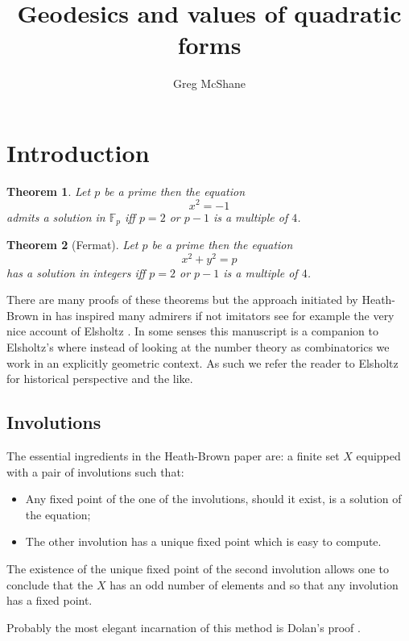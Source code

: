 \documentclass[12pt,a4paper]{amsart}
\title{Geodesics and values of quadratic forms}
\author[McShane]{Greg McShane}
\newtheorem{thm}{Theorem}[section]
\def\fp{\mathbb{F}_p}
\begin{document}
\maketitle

\section{Introduction}

	

\begin{thm}\label{triv}
Let $p$ be a prime then the equation
$$x^2 = -1$$
admits a solution in $\fp$ iff 
$p =2$ or $p-1$ is a multiple of $4$.
\end{thm}


\begin{thm}[Fermat]\label{main}
Let $p$ be a prime then the equation
$$x^2 + y^2 = p $$
has a solution in integers  iff  $p =2$ or $p-1$ is a multiple of $4$.
\end{thm}

There are many proofs of these theorems but the approach initiated
by Heath-Brown in \cite{heath} has inspired many admirers if not 
imitators see for example the very nice account of Elsholtz \cite{elsholtz}.
In some senses this manuscript is a companion 
to Elsholtz's where instead of looking at the number theory as combinatorics we work in an explicitly geometric context.
As such we refer the reader to Elsholtz for historical perspective
and the like.

\subsection{Involutions}

The essential ingredients in the Heath-Brown paper are:
a finite set $X$ equipped with a pair of involutions such that:


\begin{itemize}
	\item Any fixed point of the one of the involutions,
		should it exist, is a solution of the equation;
	\item The other involution has a unique fixed point which is easy to compute.
\end{itemize}

The existence of the unique fixed point of the second involution
allows one to conclude that  the $X$ has an odd number of elements
and so that any involution has a fixed point.

Probably the most elegant incarnation of this method is Dolan's
proof \cite{dolan}.
\end{document}
